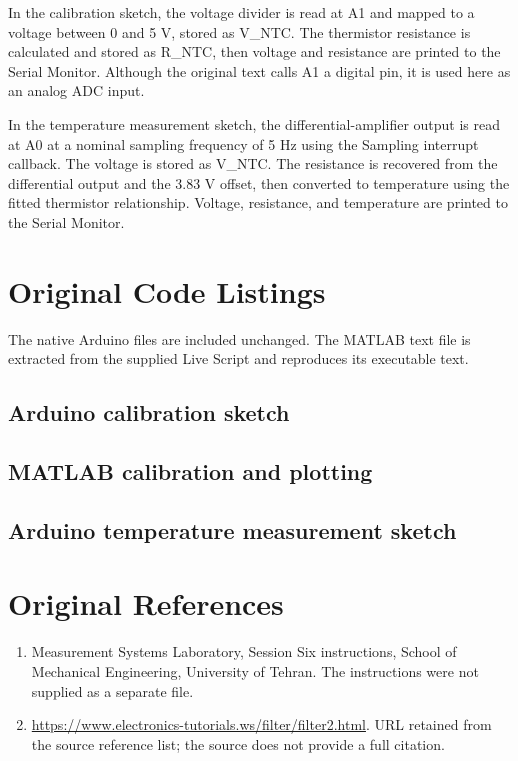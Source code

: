 \documentclass[11pt,a4paper]{article}
\begin{document}
In the calibration sketch, the voltage divider is read at A1 and mapped to a voltage between 0 and 5 V, stored as V\_NTC. The thermistor resistance is calculated and stored as R\_NTC, then voltage and resistance are printed to the Serial Monitor. Although the original text calls A1 a digital pin, it is used here as an analog ADC input.

In the temperature measurement sketch, the differential-amplifier output is read at A0 at a nominal sampling frequency of 5 Hz using the Sampling interrupt callback. The voltage is stored as V\_NTC. The resistance is recovered from the differential output and the 3.83 V offset, then converted to temperature using the fitted thermistor relationship. Voltage, resistance, and temperature are printed to the Serial Monitor.

\FloatBarrier\appendix\section{Original Code Listings}
The native Arduino files are included unchanged. The MATLAB text file is extracted from the supplied Live Script and reproduces its executable text.
\subsection{Arduino calibration sketch}

\subsection{MATLAB calibration and plotting}

\subsection{Arduino temperature measurement sketch}

\section{Original References}
\begin{enumerate}
\item Measurement Systems Laboratory, Session Six instructions, School of Mechanical Engineering, University of Tehran. The instructions were not supplied as a separate file.
\item \url{https://www.electronics-tutorials.ws/filter/filter2.html}. URL retained from the source reference list; the source does not provide a full citation.
\end{enumerate}
\end{document}
